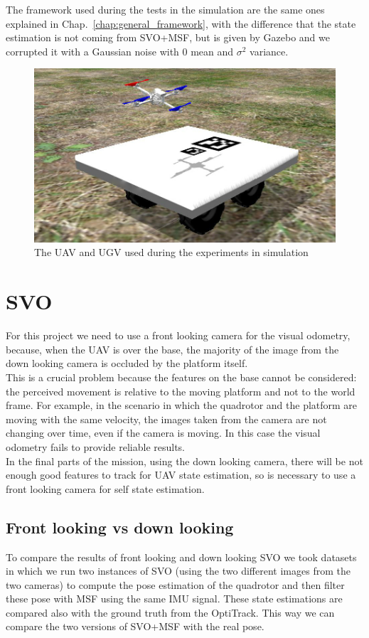 The framework used during the tests in the simulation are the same ones explained in Chap.~\ref{chap:general_framework}, with the difference that the state estimation is not coming from SVO+MSF, but is given by Gazebo and we corrupted it with a Gaussian noise with 0 mean and $\sigma^2$ variance.

\begin{figure}[!ht]
    \centering
    \includegraphics[width=1.0\textwidth]{img/simulation.jpg}
    \caption{The UAV and UGV used during the experiments in simulation}
    \label{fig:quad_ugv_sim}
\end{figure}

\section{SVO}
For this project we need to use a front looking camera for the visual odometry, because, when the UAV is over the base, the majority of the image from the down looking camera is occluded by the platform itself.\\
This is a crucial problem because the features on the base cannot be considered: the perceived movement is relative to the moving platform and not to the world frame. For example, in the scenario in which the quadrotor and the platform are moving with the same velocity, the images taken from the camera are not changing over time, even if the camera is moving. In this case the visual odometry fails to provide reliable results.\\
In the final parts of the mission, using the down looking camera, there will be not enough good features to track  for UAV state estimation, so is necessary to use a front looking camera for self state estimation.

\subsection{Front looking vs down looking}
To compare the results of front looking and down looking SVO we took datasets in which we run two instances of SVO (using the two different images from the two cameras) to compute the pose estimation of the quadrotor and then filter these pose with MSF using the same IMU signal. These state estimations are compared also with the ground truth from the OptiTrack. This way we can compare the two versions of SVO+MSF with the real pose.

